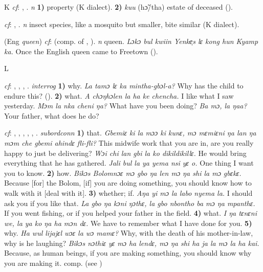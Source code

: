 \begin{letter}{K}
 \textit{cf}: , . \textit{n} \textbf{1)} property (K dialect). \textbf{2)} \textit{kuu} (hɔ̃/tha) estate of deceased (\citealt{Pichl1967}).

 \textit{cf}: , . \textit{n} insect species, like a mosquito but smaller, bite similar (K dialect).

 (Eng \textit{queen}) \textit{cf}:  (comp. of , ). \textit{n} queen. \textit{Lɔkɔ bul kwiin Yenke̹s lɛ kong hun Kyamp ka.} Once the English queen came to Freetown (\citealt{Pichl1967}). 


\end{letter}
\begin{letter}{L}

 \textit{cf}: , , , . \textit{interrog} \textbf{1)} why. \textit{La tamɔ lɛ ka mintha-gbɔl-a? }Why has the child to endure this? (\citealt{Pichl1967}). \textbf{2)} what. \textit{A chɔŋhɔlen la ha ke chencha.} I like what I saw yesterday. \textit{Mɔm la nka cheni ŋa?} What have you been doing? \textit{Ba mɔ, la ŋaa?} Your father, what does he do?



 \textit{cf}: , , , , , . \textit{subordconn} \textbf{1)} that. \textit{Gbemiɛ ki la mɔɔ ki kunɛ, mɔ mɛmiɛni ŋa lan ŋa mɔm che gbemi ahindɛ fli-fli?} This midwife work that you are in, are you really happy to just be delivering? \textit{Wɔi chi lan gbi la ko dikildikillɛ.} He would bring everything that he has gathered. \textit{Jali bul la ya yema nsi yɛ o.} One thing I want you to know. \textbf{2)} how. \textit{Bikɔs Bolomnɔɛ mɔ gbo ŋa len mɔ ŋa shi la mɔ gbɛkɛ.} Because [for] the Bolom, [if] you are doing something, you should know how to walk with it [deal with it]. \textbf{3)} whether; if. \textit{Aŋa yi mɔ la labo nyema la.} I should ask you if you like that. \textit{La gbo ŋa kɔni ŋɔthɛ, la gbo nbontho ba mɔ ŋa mpanthɛ.} If you went fishing, or if you helped your father in the field. \textbf{4)} what. \textit{I ŋa tɛnɛni we, la ya ko ŋa ha mɔn dɛ.} We have to remember what I have done for you. \textbf{5)} why. \textit{Ha wul lijajɛl wɔɛ la wɔ mamɛ?} Why, with the death of his mother-in-law, why is he laughing? \textit{Bikɔs nɔthiɛ yɛ mɔ ha lendɛ, mɔ ŋa shi ha ja la mɔ la ha kai.} Because, as human beings, if you are making something, you should know why you are making it. comp.  (see ) 


\end{letter}

